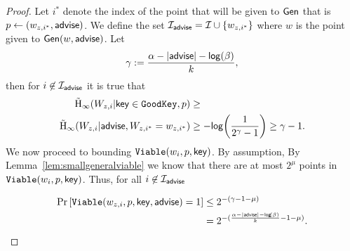 \begin{proof}
Let $i^*$ denote the index of the point that will be given to ${\mathsf{Gen}}$ that is $p\leftarrow (w_{z,i^*}, {\mathsf{advise}})$.  We define the set $\mathcal{I}_{\mathsf{advise}} = \mathcal{I} \cup \{w_{z,i^*}\}$ where $w$ is the point given to ${\mathsf{Gen}}(w, {\mathsf{advise}})$.  
Let \[\gamma:=\frac{\alpha -|{\mathsf{advise}}| - \mathsf{log}\!\left(\beta\right)}{k},\] 
then for $i\not\in \mathcal{I}_{{\mathsf{advise}}}$ it is true that 
\begin{align*}
\tilde{\mathrm{H}}_\infty(W_{z,i} | \mathsf{key} \in \mathtt{GoodKey}, p)&\ge \\
\tilde{\mathrm{H}}_\infty(W_{z,i} | {\mathsf{advise}}, W_{z,i^*}= w_{z,i^*}) &\ge -\mathsf{log}\!\left(\frac{1}{2^{\gamma}-1}\right) \ge \gamma-1.
\end{align*}
We now proceed to bounding $\mathtt{Viable}(w_i, p, \mathsf{key})$.  By assumption, By Lemma~\ref{lem:smallgeneralviable} we know that there are at most $2^\mu$ points in $\mathtt{Viable}(w_i, p, \mathsf{key})$.  Thus, for all $i\not \in\mathcal{I}_{{\mathsf{advise}}}$ 

\begin{align*}
\Pr\left[\mathtt{Viable}(w_{z,i}, p, \mathsf{key}, {\mathsf{advise}}) = 1 \right]&\le 2^{- (\gamma-1 -\mu)}\\
&=2^{-(\frac{\alpha-|{\mathsf{advise}}|-\mathsf{log}\!\left(\beta\right)}{k}-1-\mu)}.
\end{align*}
\end{proof}

